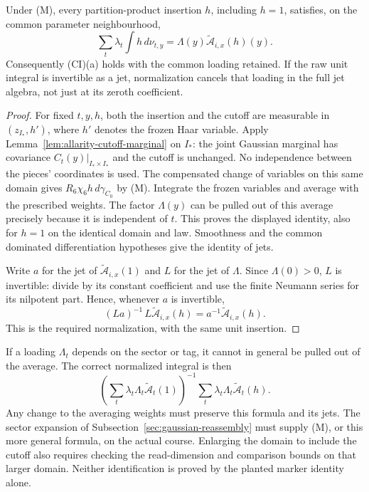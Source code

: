 \begin{lemma}
\label{lem:allarity-measure-identification}
Under (M), every partition-product insertion $h$, including $h=1$,
satisfies, on the common parameter neighbourhood,
\[
 \sum_t\lambda_t\int h\,d\nu_{t,y}
                 =\Lambda(y)\widetilde{\mathcal A}_{i,x}(h)(y).
\]
Consequently (CI)(a) holds with the common loading retained. If the raw
unit integral is invertible as a jet, normalization cancels that
loading in the full jet algebra, not just at its zeroth coefficient.
\end{lemma}
\begin{proof}
For fixed $t,y,h$, both the insertion and the cutoff are measurable in
$(z_{I_*},h')$, where $h'$ denotes the frozen Haar variable. Apply
Lemma~\ref{lem:allarity-cutoff-marginal} on $I_*$: the joint Gaussian
marginal has covariance $C_t(y)|_{I_*\times I_*}$ and the cutoff is
unchanged. No independence between the pieces' coordinates is used.
The compensated change of variables on this same domain gives
$R_6\chi_6h\,d\gamma_{C_0}$ by (M). Integrate the frozen variables and
average with the prescribed weights. The factor $\Lambda(y)$ can be
pulled out of this average precisely because it is independent of $t$.
This proves the displayed identity, also for $h=1$ on the identical
domain and law. Smoothness and the common dominated differentiation
hypotheses give the identity of jets.

Write $a$ for the jet of $\widetilde{\mathcal A}_{i,x}(1)$ and $L$ for
the jet of $\Lambda$. Since $\Lambda(0)>0$, $L$ is invertible: divide
by its constant coefficient and use the finite Neumann series for its
nilpotent part. Hence, whenever $a$ is invertible,
\[
 (La)^{-1}\,L\widetilde{\mathcal A}_{i,x}(h)
                         =a^{-1}\widetilde{\mathcal A}_{i,x}(h).
\]
This is the required normalization, with the same unit insertion.
\end{proof}

If a loading $\Lambda_t$ depends on the sector or tag, it cannot in
general be pulled out of the average. The correct normalized integral
is then
\[
 \left(\sum_t\lambda_t\Lambda_t\widetilde{\mathcal A}_t(1)\right)^{-1}
       \sum_t\lambda_t\Lambda_t\widetilde{\mathcal A}_t(h).
\]
Any change to the averaging weights must preserve this formula and its
jets. The sector expansion of Subsection~\ref{sec:gaussian-reassembly}
must supply (M), or this more general formula, on the actual course.
Enlarging the domain to include the cutoff also requires checking the
read-dimension and comparison bounds on that larger domain. Neither
identification is proved by the planted marker identity alone.

